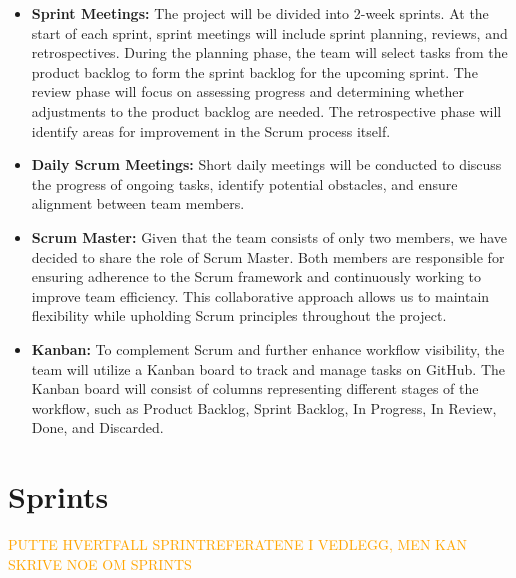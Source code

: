 \begin{itemize}
    \item \textbf{Sprint Meetings:} The project will be divided into 2-week sprints. At the start of each sprint, sprint meetings will include sprint planning, reviews, and retrospectives. During the planning phase, the team will select tasks from the product backlog to form the sprint backlog for the upcoming sprint. The review phase will focus on assessing progress and determining whether adjustments to the product backlog are needed. The retrospective phase will identify areas for improvement in the Scrum process itself.
    \item \textbf{Daily Scrum Meetings:} Short daily meetings will be conducted to discuss the progress of ongoing tasks, identify potential obstacles, and ensure alignment between team members.
    \item \textbf{Scrum Master:} Given that the team consists of only two members, we have decided to share the role of Scrum Master. Both members are responsible for ensuring adherence to the Scrum framework and continuously working to improve team efficiency. This collaborative approach allows us to maintain flexibility while upholding Scrum principles throughout the project.
    \item \textbf{Kanban:} To complement Scrum and further enhance workflow visibility, the team will utilize a Kanban board to track and manage tasks on GitHub. The Kanban board will consist of columns representing different stages of the workflow, such as Product Backlog, Sprint Backlog, In Progress, In Review, Done, and Discarded.
\end{itemize}

\section{Sprints}

\textcolor{orange}{PUTTE HVERTFALL SPRINTREFERATENE I VEDLEGG, MEN KAN SKRIVE NOE OM SPRINTS}

